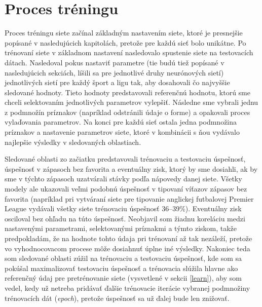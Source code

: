 \section{Proces tréningu} \label{train}
Proces tréningu siete začínal základným nastavením siete, ktoré je presnejšie popísané v nasledujúcich kapitolách, pretože pre každú sieť bolo unikátne.
Po trénovaní siete v základnom nastavení nasledovalo spustenie siete na testovacích dátach.
Nasledoval pokus nastaviť parametre (tie budú tiež popísané v nasledujúcich sekciách, líšili sa pre jednotlivé druhy neurónových sietí) jednotlivých sietí pre každý šport a ligu tak, aby dosahovali čo najvyššie sledované hodnoty.
Tieto hodnoty predstavovali referenčnú hodnotu, ktorú sme chceli selektovaním jednotlivých parametrov vylepšiť.
Následne sme vybrali jednu z podmnožín príznakov (napríklad odstránili údaje o forme) a opakovali proces vylaďovania parametrov.
Na konci pre každú sieť ostala jedna podmnožina príznakov a nastavenie parametrov siete, ktoré v kombinácii s ňou vydávalo najlepšie výsledky v sledovaných oblastiach.

Sledované oblasti zo začiatku predstavovali trénovaciu a testovaciu úspešnosť, úspešnosť v zápasoch bez favorita a eventuálny zisk, ktorý by sme dosiahli, ak by sme v týchto zápasoch uzatvárali stávky podľa nápovedy danej siete. 
Všetky modely ale ukazovali veľmi podobnú úspešnosť v tipovaní víťazov zápasov bez favorita (napríklad pri vytváraní siete pre tipovanie anglickej futbalovej Premier League vydávali všetky siete trénovaciu úspešnosť 36--39\%).
Eventuálny zisk osciloval bez ohľadu na túto úspešnosť.
Neobjavil som žiadnu koreláciu medzi nastavenými parametrami, selektovanými príznakmi a týmto ziskom, takže predpokladám, že na hodnote tohto údaja pri trénovaní až tak nezáleží, pretože vo vyhodnocovacom procese môže dosiahnuť úplne iné výsledky.
Nakoniec teda som sledované oblasti zúžil na trénovaciu a testovaciu úspešnosť, kde som sa pokúšal maximalizovať testovaciu úspešnosť a trénovacia slúžila hlavne ako referenčný údaj pre pretrénovanie siete (vysvetlené v sekcii \ref{learn}), aby som vedel, kedy už netreba pridávať ďalšie trénovacie iterácie vybranej podmnožiny trénovacích dát (\textit{epoch}), pretože úspešnosť sa už ďalej bude len znižovať.

